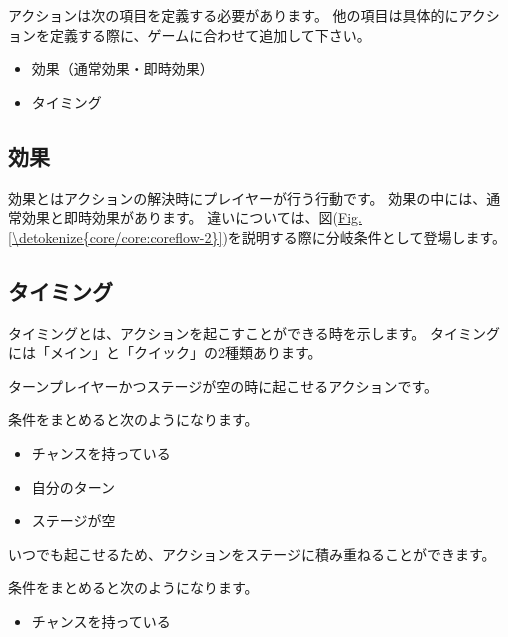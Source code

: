 \documentclass[letterpaper,10pt,dvipdfmx]{sphinxmanual}
\begin{document}
\sphinxAtStartPar
アクションは次の項目を定義する必要があります。
他の項目は具体的にアクションを定義する際に、ゲームに合わせて追加して下さい。
\begin{itemize}
\item {} 
\sphinxAtStartPar
効果（通常効果・即時効果）

\item {} 
\sphinxAtStartPar
タイミング

\end{itemize}


\subsection{効果}
\label{\detokenize{core/core:id7}}
\sphinxAtStartPar
効果とはアクションの解決時にプレイヤーが行う行動です。
効果の中には、通常効果と即時効果があります。
違いについては、図(\hyperref[\detokenize{core/core:coreflow-2}]{Fig.\@ \ref{\detokenize{core/core:coreflow-2}}})を説明する際に分岐条件として登場します。


\subsection{タイミング}
\label{\detokenize{core/core:timing}}\label{\detokenize{core/core:id8}}
\sphinxAtStartPar
タイミングとは、アクションを起こすことができる時を示します。
タイミングには「メイン」と「クイック」の2種類あります。
\begin{description}
\sphinxAtStartPar
ターンプレイヤーかつステージが空の時に起こせるアクションです。

\sphinxAtStartPar
条件をまとめると次のようになります。
\begin{itemize}
\item {} 
\sphinxAtStartPar
チャンスを持っている

\item {} 
\sphinxAtStartPar
自分のターン

\item {} 
\sphinxAtStartPar
ステージが空

\end{itemize}

\sphinxAtStartPar
いつでも起こせるため、アクションをステージに積み重ねることができます。

\sphinxAtStartPar
条件をまとめると次のようになります。
\begin{itemize}
\item {} 
\sphinxAtStartPar
チャンスを持っている

\end{itemize}

\end{description}
\end{document}
